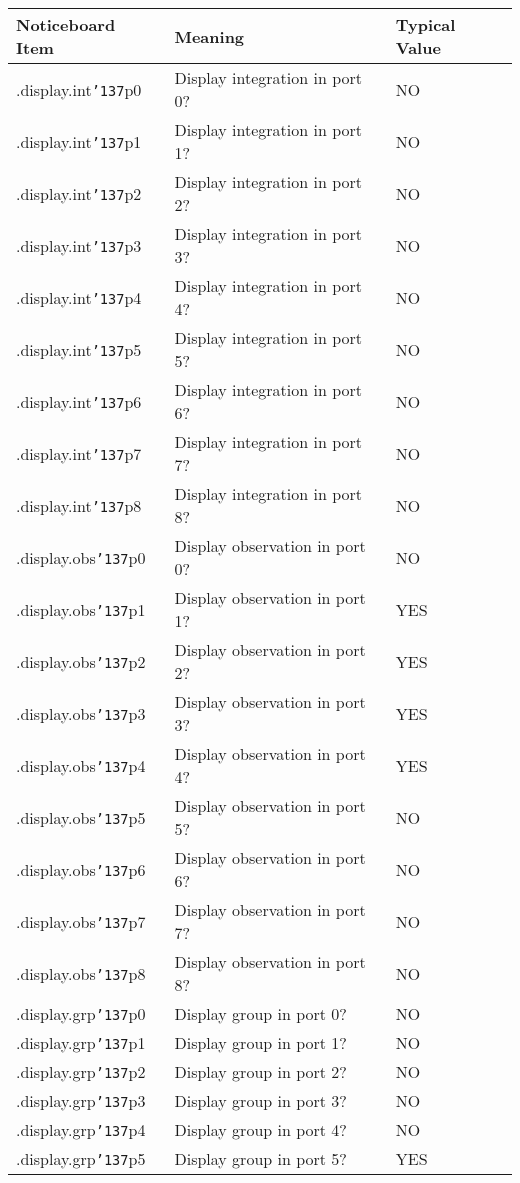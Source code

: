 \documentclass[a4paper]{book}
\renewcommand{\_}{{\tt\char'137}}
\begin{document}
\begin{table}
\begin{center}
\begin{tabular}{||l|l|l||}
\hline
Noticeboard Item\footnotemark[2] & Meaning & Typical Value \\
\hline
.display.int\_p0 & Display integration in port 0? & NO \\
.display.int\_p1 & Display integration in port 1? & NO \\
.display.int\_p2 & Display integration in port 2? & NO \\
.display.int\_p3 & Display integration in port 3? & NO \\
.display.int\_p4 & Display integration in port 4? & NO \\
.display.int\_p5 & Display integration in port 5? & NO \\
.display.int\_p6 & Display integration in port 6? & NO \\
.display.int\_p7 & Display integration in port 7? & NO \\
.display.int\_p8 & Display integration in port 8? & NO \\
.display.obs\_p0 & Display observation in port 0? & NO \\
.display.obs\_p1 & Display observation in port 1? & YES \\
.display.obs\_p2 & Display observation in port 2? & YES \\
.display.obs\_p3 & Display observation in port 3? & YES \\
.display.obs\_p4 & Display observation in port 4? & YES \\
.display.obs\_p5 & Display observation in port 5? & NO \\
.display.obs\_p6 & Display observation in port 6? & NO \\
.display.obs\_p7 & Display observation in port 7? & NO \\
.display.obs\_p8 & Display observation in port 8? & NO \\
.display.grp\_p0 & Display group in port 0? & NO \\
.display.grp\_p1 & Display group in port 1? & NO \\
.display.grp\_p2 & Display group in port 2? & NO \\
.display.grp\_p3 & Display group in port 3? & NO \\
.display.grp\_p4 & Display group in port 4? & NO \\
.display.grp\_p5 & Display group in port 5? & YES \\

\end{tabular}
\end{center}
\end{table}
\end{document}
